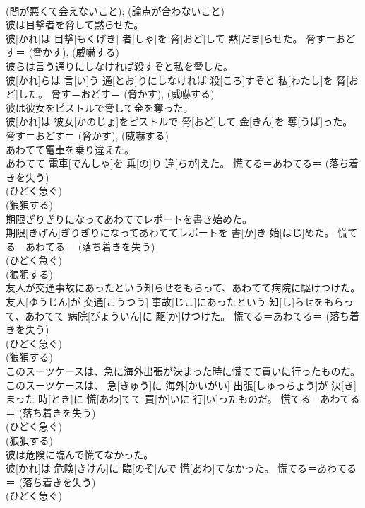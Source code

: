 \documentclass[8pt]{extreport}
\begin{document}
\begin{CJK}{UTF8}{min}
{\\	(間が悪くて会えないこと); (論点が合わないこと)
\\	彼は目撃者を脅して黙らせた。	
\\	彼[かれ]は 目撃[もくげき] 者[しゃ]を 脅[おど]して 黙[だま]らせた。	脅す＝おどす＝ (脅かす), (威嚇する) 
\\	彼らは言う通りにしなければ殺すぞと私を脅した。	
\\	彼[かれ]らは 言[い]う 通[とお]りにしなければ 殺[ころ]すぞと 私[わたし]を 脅[おど]した。	脅す＝おどす＝ (脅かす), (威嚇する) 
\\	彼は彼女をピストルで脅して金を奪った。	
\\	彼[かれ]は 彼女[かのじょ]をピストルで 脅[おど]して 金[きん]を 奪[うば]った。	脅す＝おどす＝ (脅かす), (威嚇する) 
\\	あわてて電車を乗り違えた。	
\\	あわてて 電車[でんしゃ]を 乗[の]り 違[ちが]えた。	慌てる＝あわてる＝ (落ち着きを失う) 
\\	(ひどく急ぐ) 
\\	(狼狽する)
\\	期限ぎりぎりになってあわててレポートを書き始めた。	
\\	期限[きげん]ぎりぎりになってあわててレポートを 書[か]き 始[はじ]めた。	慌てる＝あわてる＝ (落ち着きを失う) 
\\	(ひどく急ぐ) 
\\	(狼狽する)
\\	友人が交通事故にあったという知らせをもらって、あわてて病院に駆けつけた。	
\\	友人[ゆうじん]が 交通[こうつう] 事故[じこ]にあったという 知[し]らせをもらって、あわてて 病院[びょういん]に 駆[か]けつけた。	慌てる＝あわてる＝ (落ち着きを失う) 
\\	(ひどく急ぐ) 
\\	(狼狽する)
\\	このスーツケースは、急に海外出張が決まった時に慌てて買いに行ったものだ。	
\\	このスーツケースは、 急[きゅう]に 海外[かいがい] 出張[しゅっちょう]が 決[き]まった 時[とき]に 慌[あわ]てて 買[か]いに 行[い]ったものだ。	慌てる＝あわてる＝ (落ち着きを失う) 
\\	(ひどく急ぐ) 
\\	(狼狽する)
\\	彼は危険に臨んで慌てなかった。	
\\	彼[かれ]は 危険[きけん]に 臨[のぞ]んで 慌[あわ]てなかった。	慌てる＝あわてる＝ (落ち着きを失う) 
\\	(ひどく急ぐ) 
}
\end{CJK}
\end{document}
